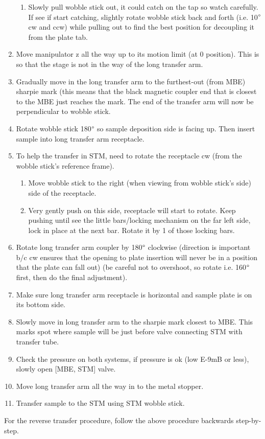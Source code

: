 \begin{enumerate}
\begin{enumerate}
	\item	Slowly pull wobble stick out, it could catch on the tap so watch carefully. If see if start catching, slightly rotate wobble stick back and forth (i.e. 10$\degree$ cw and ccw) while pulling out to find the best position for decoupling it from the plate tab. 
\end{enumerate}
	\item	Move manipulator z all the way up to its motion limit (at 0 position). This is so that the stage is not in the way of the long transfer arm.
	\item	Gradually move in the long transfer arm to the furthest-out (from MBE) sharpie mark (this means that the black magnetic coupler end that is closest to the MBE just reaches the mark. The end of the transfer arm will now be perpendicular to wobble stick.
	\item Rotate wobble stick 180$\degree$ so sample deposition side is facing up. Then insert sample into long transfer arm receptacle.
	\item	To help the transfer in STM, need to rotate the receptacle cw (from the wobble stick’s reference frame).
	\begin{enumerate}
		\item	Move wobble stick to the right (when viewing from wobble stick’s side) side of the receptacle.
		\item	Very gently push on this side, receptacle will start to rotate. Keep pushing until see the little bars/locking mechanism on the far left side, lock in place at the next bar. Rotate it by 1 of those locking bars.
	\end{enumerate}
\item	Rotate long transfer arm coupler by 180$\degree$ clockwise (direction is important b/c cw ensures that the opening to plate insertion will never be in a position that the plate can fall out) (be careful not to overshoot, so rotate i.e. 160$\degree$ first, then do the final adjustment). 
	\item	Make sure long transfer arm receptacle is horizontal and sample plate is on its bottom side.

	\item	Slowly move in long transfer arm to the sharpie mark closest to MBE.  This marks spot where sample will be just before valve connecting STM with transfer tube.
	\item	Check the pressure on both systems, if pressure is ok (low E-9mB or less), slowly open [MBE, STM] valve.
	\item	Move long transfer arm all the way in to the metal stopper.
	\item	Transfer sample to the STM using STM wobble stick.
	\end{enumerate}
	For the reverse transfer procedure, follow the above procedure backwards step-by-step.
	
